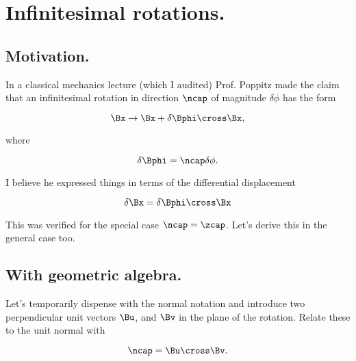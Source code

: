 
%

\chapter{Infinitesimal rotations.}
\label{chap:infinitesimalRotation}
{}
\date{Jan 27, 2012}

\beginArtWithToc

\section{Motivation.}

In a classical mechanics lecture (which I audited) Prof. Poppitz made the claim that an infinitesimal rotation in direction $\ncap$ of magnitude $\delta \phi$ has the form

\begin{equation}\label{eqn:continuumL6:n}
\Bx \rightarrow \Bx + \delta \Bphi \cross \Bx,
\end{equation}

where

\begin{equation}\label{eqn:continuumL6:n}
\delta \Bphi = \ncap \delta \phi.
\end{equation}

I believe he expressed things in terms of the differential displacement

\begin{equation}\label{eqn:continuumL6:n}
\delta \Bx = \delta \Bphi \cross \Bx
\end{equation}

This was verified for the special case $\ncap = \zcap$.  Let's derive this in the general case too.

\section{With geometric algebra.}

Let's temporarily dispense with the normal notation and introduce two perpendicular unit vectors $\Bu$, and $\Bv$ in the plane of the rotation.  Relate these to the unit normal with

\begin{equation}\label{eqn:continuumL6:n}
\ncap = \Bu \cross \Bv.
\end{equation}

